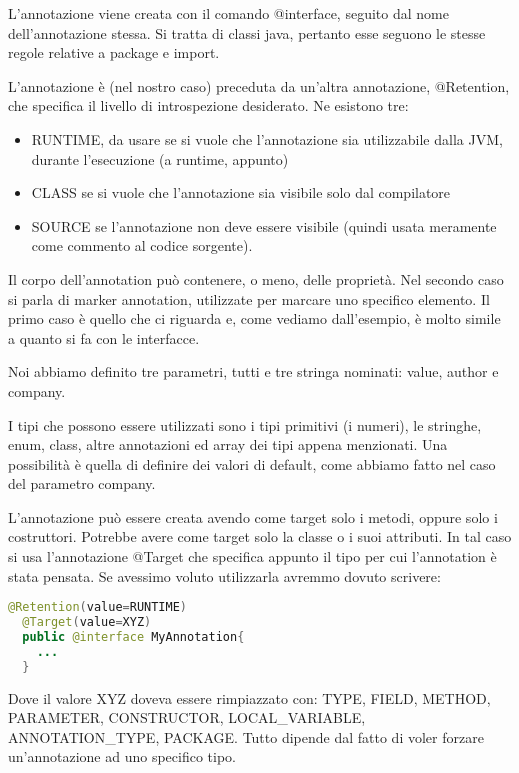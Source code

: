\documentclass[a4paper,12pt,twoside]{book}
\begin{document}
L'annotazione viene creata con il comando @interface, seguito dal nome
dell'annotazione stessa. Si tratta di classi java, pertanto
esse seguono le stesse regole relative a package e import.

L'annotazione è (nel nostro caso) preceduta da un'altra annotazione,
@Retention, che specifica il livello di introspezione desiderato. Ne
esistono tre: 
\begin{itemize}
\item RUNTIME, da usare se si vuole che l'annotazione sia utilizzabile
  dalla JVM, durante l'esecuzione (a runtime, appunto)
\item CLASS se si vuole che l'annotazione sia visibile solo dal
  compilatore
\item  SOURCE se l'annotazione non deve essere
  visibile (quindi usata meramente come commento al codice sorgente).
\end{itemize}
Il corpo dell'annotation può contenere, o meno, delle proprietà. Nel
secondo caso si parla di marker annotation, utilizzate per marcare uno
specifico elemento. Il primo caso è quello che ci riguarda e, come
vediamo dall'esempio, è molto simile a quanto si fa con le interfacce.

Noi abbiamo definito tre parametri, tutti e tre stringa nominati:
value, author e company.

I tipi che possono essere utilizzati sono i tipi primitivi (i numeri),
le stringhe, enum, class, altre annotazioni ed array dei tipi appena
menzionati. Una possibilità è quella di definire dei valori di
default, come abbiamo fatto nel caso del parametro company.  

L'annotazione può essere creata avendo come target solo i metodi,
oppure solo i costruttori. Potrebbe avere come target solo la classe o
i suoi attributi. In tal caso si usa l'annotazione @Target che
specifica appunto il tipo per cui l'annotation è stata pensata. Se
avessimo voluto utilizzarla avremmo dovuto scrivere:

\begin{lstlisting}[caption={}, label={lst:target}, language=Java]
  @Retention(value=RUNTIME)
  @Target(value=XYZ)
  public @interface MyAnnotation{
    ...
  }
\end{lstlisting}

Dove il valore XYZ doveva essere rimpiazzato con: TYPE, FIELD, METHOD,
PARAMETER, CONSTRUCTOR, LOCAL\_VARIABLE, ANNOTATION\_TYPE,
PACKAGE. Tutto dipende dal fatto di voler forzare un'annotazione ad
uno specifico tipo.
\end{document}
